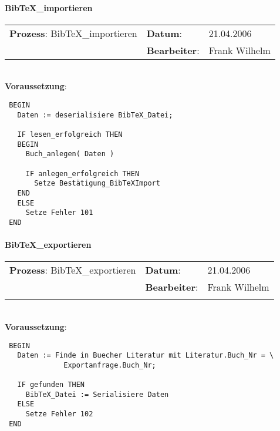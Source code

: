\paragraph{BibTeX\_importieren}
\begin{tabular}[t]{p{9.5cm}ll}
\textbf{Prozess}: BibTeX\_importieren  	&\textbf{Datum}:      &21.04.2006\\
					&\textbf{Bearbeiter}: &Frank Wilhelm\\
\end{tabular}

\hrulefill\\
\textbf{Voraussetzung}:
\begin{verbatim}
 BEGIN
   Daten := deserialisiere BibTeX_Datei;
   
   IF lesen_erfolgreich THEN
   BEGIN
     Buch_anlegen( Daten )
     
     IF anlegen_erfolgreich THEN
       Setze Bestätigung_BibTeXImport
   END
   ELSE
     Setze Fehler 101
 END
\end{verbatim}
\hrulefill


\paragraph{BibTeX\_exportieren}
\begin{tabular}[t]{p{9.5cm}ll}
\textbf{Prozess}: BibTeX\_exportieren  	&\textbf{Datum}:      &21.04.2006\\
					&\textbf{Bearbeiter}: &Frank Wilhelm\\\\
\end{tabular}

\hrulefill\\
\textbf{Voraussetzung}:
\begin{verbatim}
 BEGIN
   Daten := Finde in Buecher Literatur mit Literatur.Buch_Nr = \
              Exportanfrage.Buch_Nr;
  
   IF gefunden THEN
     BibTeX_Datei := Serialisiere Daten
   ELSE
     Setze Fehler 102
 END
\end{verbatim}

\hrulefill

